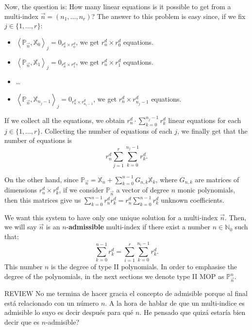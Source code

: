 \documentclass[12pt,a4]{report}
\theoremstyle{plain}
\newcommand{\N}[0]{\mathbb{N}}
\newcommand{\cb}[1]{{\color{blue}#1}}
\newcommand{\prodesc}[2]{\left\langle #1 , #2 \right\rangle}
\begin{document}
Now, the question is: How many linear equations is it possible to get from a multi-index $\vec n =(n_1, \dots, n_r)$? The answer to this problem is easy since, if we fix $j\in\{1,\dots,r\}$:
\begin{itemize}
    \item $\prodesc{\mathbb P_{\vec n}}{\mathbb X_0}_j = 0_{r^d_n\times r^d_0}$, we get $r^d_n\times r^d_0$ equations.
    \item $\prodesc{\mathbb P_{\vec n}}{\mathbb X_1}_j = 0_{r^d_n\times r^d_1}$, we get $r^d_n\times r^d_1$ equations.
    \item \dots
    \item $\prodesc{\mathbb P_{\vec n}}{\mathbb X_{n_j-1}}_j = 0_{r^d_n\times r^d_{n_i-1}}$, we get $r^d_n\times r^d_{n_j-1}$ equations.
\end{itemize} 
If we collect all the equations, we obtain $r_n^d\cdot\displaystyle\sum_{k=0}^{n_j-1}r^d_k$ linear equations for each $j\in\{1,\dots,r\}$. Collecting the number of equations of each $j$, we finally get that the number of equations is 
\begin{equation}
    \label{eq:number-eqs}
    r_n^d \sum_{j=1}^r \sum_{k=0}^{n_j-1} r_k^d.
\end{equation}

On the other hand, since $\mathbb P_{\vec n} = \mathbb X_n + \displaystyle\sum_{k=0}^{n-1}G_{n,k} \mathbb X_k$, where $G_{n,k}$ are matrices of dimensions $r^d_n\times r^d_k$, if we consider $\mathbb P_{\vec n}$ a vector of degree $n$ monic polynomials, then this matrices give us $\displaystyle\sum_{k=0}^{n-1}r^d_n r^d_k=r^d_n\displaystyle\sum_{k=0}^{n-1} r^d_k$ unknown coefficients.

We want this system to have only one unique solution for a multi-index $\vec n$. Then, we will say $\vec n$ is an $n$-\textbf{admissible} multi-index if there exist a number $n\in\N_0$ such that:
\begin{equation}
    \label{eq:condition-type-ii-general}
    \displaystyle\sum_{k=0}^{n-1} r^d_k = \sum_{i=1}^r \sum_{k=0}^{n_i-1} r_k^d.
\end{equation}
This number $n$ is the degree of type II polynomials. In order to emphasise the degree of the polynomials, in the next sections we denote type II MOP as $\mathbb P_{\vec n}^n$.

\cb{REVIEW No me termina de hacer gracia el concepto de admisible porque al final está relacionado con un número $n$. A la hora de hablar de que un multi-indice es admisible lo suyo es decir después para qué $n$. He pensado que quizá estaría bien decir que es $n$-admisible?}
\end{document}
